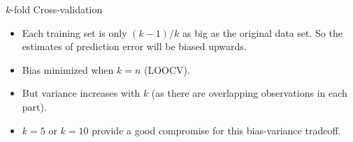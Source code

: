 \documentclass[14pt]{beamer}
\begin{document}
\begin{frame}{$k$-fold Cross-validation}
\begin{itemize}
\item Each training set is only $(k-1)/k$ as big as the original data set. So the estimates of prediction error will be biased upwards.
\item Bias minimized when $k=n$ (LOOCV).

\item But variance increases with $k$ (as there are overlapping observations in each part).

\item $k=5$ or $k=10$ provide a good compromise for this bias-variance tradeoff.
\end{itemize}
\end{frame}
\end{document}
